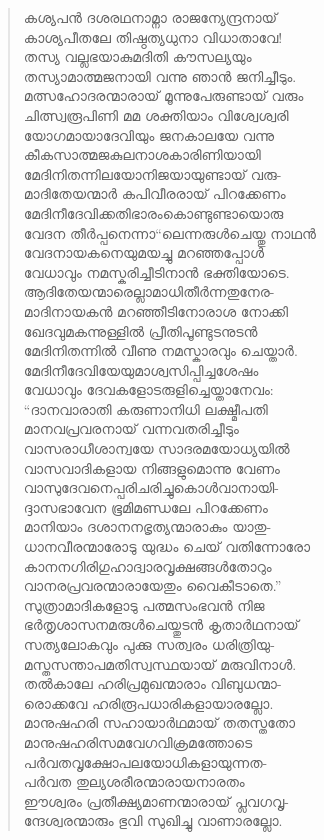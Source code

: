 \begin{verse}
കശ്യപന്‍ ദശരഥനാമ്നാ രാജന്യേന്ദ്രനായ്\\
കാശ്യപീതലേ തിഷ്ഠത്യധുനാ വിധാതാവേ!\\
തസ്യ വല്ലഭയാകുമദിതി കൗസല്യയും\\
തസ്യാമാത്മജനായി വന്നു ഞാന്‍ ജനിച്ചീടും.\\
മത്സഹോദരന്മാരായ് മൂന്നുപേരുണ്ടായ് വരും\\
ചിത്സ്വരൂപിണി മമ ശക്തിയാം വിശ്വേശ്വരി\\
യോഗമായാദേവിയും ജനകാലയേ വന്നു\\
കീകസാത്മജകുലനാശകാരിണിയായി\\
മേദിനിതന്നിലയോനിജയായുണ്ടായ് വരു-\\
മാദിതേയന്മാര്‍ കപിവീരരായ് പിറക്കേണം\\
മേദിനീദേവിക്കതിഭാരംകൊണ്ടുണ്ടായൊരു\\
വേദന തീര്‍പ്പനെന്നാ“ലെന്നരുള്‍ചെയ്തു നാഥന്‍\\
വേദനായകനെയുമയച്ചു മറഞ്ഞപ്പോള്‍\\
വേധാവും നമസ്കരിച്ചീടിനാന്‍ ഭക്തിയോടെ.\\
ആദിതേയന്മാരെല്ലാമാധിതീര്‍ന്നതുനേര-\\
മാദിനായകന്‍ മറഞ്ഞീടിനോരാശ നോക്കി\\
ഖേദവുമകന്നുള്ളില്‍ പ്രീതിപൂണ്ടുടനുടന്‍\\
മേദിനിതന്നില്‍ വീണു നമസ്കാരവും ചെയ്താര്‍.\\
മേദിനീദേവിയേയുമാശ്വസിപ്പിച്ചശേഷം\\
വേധാവും ദേവകളോടരുളിച്ചെയ്താനേവം:\\
“ദാനവാരാതി കരുണാനിധി ലക്ഷ്മീപതി\\
മാനവപ്രവരനായ് വന്നവതരിച്ചീടും\\
വാസരാധീശാന്വയേ സാദരമയോധ്യയില്‍\\
വാസവാദികളായ നിങ്ങളുമൊന്നു വേണം\\
വാസുദേവനെപ്പരിചരിച്ചുകൊള്‍വാനായി-\\
ദ്ദാസഭാവേന ഭൂമിമണ്ഡലേ പിറക്കേണം\\
മാനിയാം ദശാനനഭൃത്യന്മാരാകും യാതു-\\
ധാനവീരന്മാരോടു യുദ്ധം ചെയ് വതിന്നോരോ\\
കാനനഗിരിഗുഹാദ്വാരവൃക്ഷങ്ങള്‍തോറും\\
വാനരപ്രവരന്മാരായേതും വൈകീടാതെ.”\\
സുത്രാമാദികളോടു പത്മസംഭവന്‍ നിജ\\
ഭര്‍തൃശാസനമരുള്‍ചെയ്തുടന്‍ കൃതാര്‍ഥനായ്\\
സത്യലോകവും പുക്കു സത്വരം ധരിത്രിയു-\\
മസ്തസന്താപമതിസ്വസ്ഥയായ് മരുവിനാള്‍.\\
തല്‍കാലേ ഹരിപ്രമുഖന്മാരാം വിബുധന്മാ-\\
രൊക്കവേ ഹരിരൂപധാരികളായാരല്ലോ.\\
മാനുഷഹരി സഹായാര്‍ഥമായ് തതസ്തതോ\\
മാനുഷഹരിസമവേഗവിക്രമത്തോടെ\\
പര്‍വതവൃക്ഷോപലയോധികളായുന്നത-\\
പര്‍വത തുല്യശരീരന്മാരായനാരതം\\
ഈശ്വരം പ്രതീക്ഷ്യമാണന്മാരായ് പ്ലവഗവൃ-\\
ന്ദേശ്വരന്മാരും ഭുവി സുഖിച്ചു വാണാരല്ലോ.
\end{verse}

